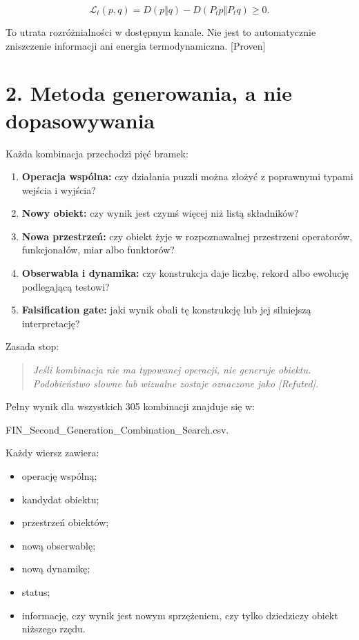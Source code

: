 \documentclass[11pt,a4paper,openany]{report}
\newcommand{\statusProven}{\textcolor{fingreen}{[Proven]}}
\newcommand{\statusRefuted}{\textcolor{finred}{[Refuted]}}
\begin{document}
\[
\mathcal L_t(p,q)
=D(p\Vert q)-D(P_tp\Vert P_tq)\geq0.
\]

To utrata rozró\.znialności w dostępnym kanale. Nie jest to automatycznie zniszczenie informacji ani energia termodynamiczna. \statusProven{}

\chapter{2. Metoda generowania, a nie dopasowywania}

Ka\.zda kombinacja przechodzi pięć bramek:

\begin{enumerate}
\item 
\textbf{Operacja wspólna:} czy działania puzzli mo\.zna zło\.zyć z poprawnymi typami wejścia i wyjścia?

\item 
\textbf{Nowy obiekt:} czy wynik jest czymś więcej ni\.z listą składników?

\item 
\textbf{Nowa przestrzeń:} czy obiekt \.zyje w rozpoznawalnej przestrzeni operatorów, funkcjonałów, miar albo funktorów?

\item 
\textbf{Obserwabla i dynamika:} czy konstrukcja daje liczbę, rekord albo ewolucję podlegającą testowi?

\item 
\textbf{Falsification gate:} jaki wynik obali tę konstrukcję lub jej silniejszą interpretację?

\end{enumerate}

Zasada stop:

\begin{quote}\itshape
Jeśli kombinacja nie ma typowanej operacji, nie generuje obiektu. Podobieństwo słowne lub wizualne zostaje oznaczone jako \statusRefuted{}.

\end{quote}

Pełny wynik dla wszystkich 305 kombinacji znajduje się w:

FIN\_Second\_Generation\_Combination\_Search.csv.

Ka\.zdy wiersz zawiera:

\begin{itemize}
\item 
operację wspólną;

\item 
kandydat obiektu;

\item 
przestrzeń obiektów;

\item 
nową obserwablę;

\item 
nową dynamikę;

\item 
status;

\item 
informację, czy wynik jest nowym sprzę\.zeniem, czy tylko dziedziczy obiekt ni\.zszego rzędu.

\end{itemize}
\end{document}
